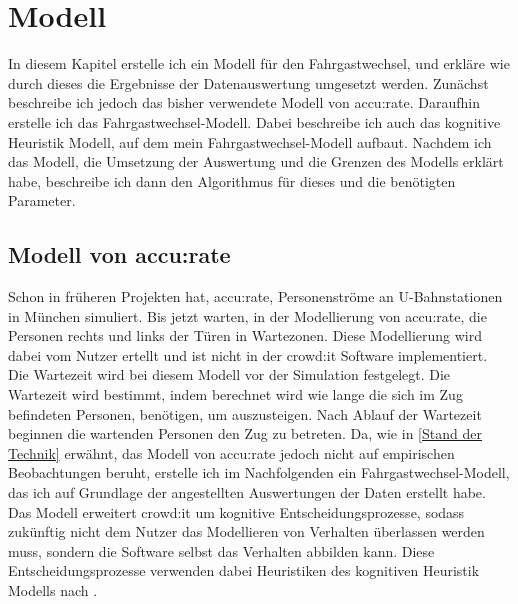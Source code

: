 \chapter{Modell} \label{Modell}
In diesem Kapitel erstelle ich ein Modell für den Fahrgastwechsel, und erkläre wie durch dieses die Ergebnisse der Datenauswertung umgesetzt werden. Zunächst beschreibe ich jedoch das bisher verwendete Modell von accu:rate. Daraufhin erstelle ich das Fahrgastwechsel-Modell. Dabei beschreibe ich auch das kognitive Heuristik Modell, auf dem mein Fahrgastwechsel-Modell aufbaut. Nachdem ich das Modell, die Umsetzung der Auswertung und die Grenzen des Modells erklärt habe, beschreibe ich dann den Algorithmus für dieses und die benötigten Parameter.
\section{Modell von accu:rate} \label{Accurate Modell}
Schon in früheren Projekten hat, accu:rate, Personenströme an U-Bahnstationen in München simuliert. Bis jetzt warten, in der Modellierung von accu:rate, die Personen rechts und links der Türen in Wartezonen. Diese Modellierung wird dabei vom Nutzer ertellt und ist nicht in der crowd:it Software implementiert. Die Wartezeit wird bei diesem Modell vor der Simulation festgelegt. Die Wartezeit wird bestimmt, indem berechnet wird wie lange die sich im Zug befindeten Personen, benötigen, um auszusteigen. Nach Ablauf der Wartezeit beginnen die wartenden Personen den Zug zu betreten. Da, wie in \ref{Stand der Technik} erwähnt, das Modell von accu:rate jedoch nicht auf empirischen Beobachtungen beruht, erstelle ich im Nachfolgenden ein Fahrgastwechsel-Modell, das ich auf Grundlage der angestellten Auswertungen der Daten erstellt habe. Das Modell erweitert crowd:it um kognitive Entscheidungsprozesse, sodass zukünftig nicht dem Nutzer das Modellieren von Verhalten überlassen werden muss, sondern die Software selbst das Verhalten abbilden kann. Diese Entscheidungsprozesse verwenden dabei Heuristiken des kognitiven Heuristik Modells nach \cite{Seitz.2016}. 
